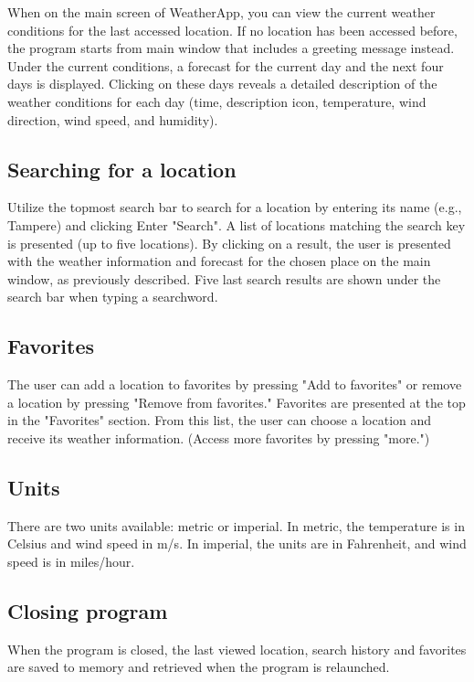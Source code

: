 \documentclass[a4paper,10pt]{article}
\begin{document}
When on the main screen of WeatherApp, you can view the current weather conditions for the last accessed location. If no location has been accessed before, the program starts from main window that includes a greeting message instead. Under the current conditions, a forecast for the current day and the next four days is displayed. Clicking on these days reveals a detailed description of the weather conditions for each day (time, description icon, temperature, wind direction, wind speed, and humidity).

\subsection{Searching for a location}

Utilize the topmost search bar to search for a location by entering its name (e.g., Tampere) and clicking Enter "Search". A list of locations matching the search key is presented (up to five locations). By clicking on a result, the user is presented with the weather information and forecast for the chosen place on the main window, as previously described. Five last search results are shown under the search bar when typing a searchword.

\subsection{Favorites}

The user can add a location to favorites by pressing "Add to favorites" or remove a location by pressing "Remove from favorites." Favorites are presented at the top in the "Favorites" section. From this list, the user can choose a location and receive its weather information. (Access more favorites by pressing "more.")

\subsection{Units}

There are two units available: metric or imperial. In metric, the temperature is in Celsius and wind speed in m/s. In imperial, the units are in Fahrenheit, and wind speed is in miles/hour.

\subsection{Closing program}

When the program is closed, the last viewed location, search history and favorites are saved to memory and retrieved when the program is relaunched.
\end{document}
